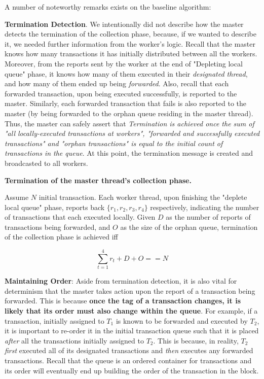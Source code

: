 A number of noteworthy remarks exists on the baseline algorithm:

\textbf{Termination Detection}. We intentionally did not describe how the master detects the
termination of the collection phase, because, if we wanted to describe it, we needed further information from the
worker's logic. Recall that the master knows how many transactions it has initially
distributed between all the workers. Moreover, from the reports sent by the worker at the end of
"Depleting local queue" phase, it knows how many of them executed in their \textit{designated
thread}, and how many of them ended up being \textit{forwarded}. Also, recall that each forwarded
transaction, upon being executed successfully, is reported to the master. Similarly, each forwarded
transaction that fails is also reported to the master (by being forwarded to the orphan queue
residing in the master thread). Thus, the master can safely assert that \textit{Termination is achieved once
the sum of "all locally-executed transactions at workers", "forwarded and successfully executed
transactions" and "orphan transactions" is equal to the initial count of transactions in the queue}.
At this point, the termination message is created and broadcasted to all workers.

\begin{definition}
	\textbf{Termination of the master thread's collection phase. }

	Assume $N$ initial transaction. Each worker thread, upon finishing the "deplete local queue"
	phase, reports back $\{ r_{1}, r_{2}, r_{3}, r_{4} \}$ respectively, indicating the number of transactions
	that each executed locally. Given $D$ as the number of reports of transactions being
	forwarded, and $O$ as the size of the orphan queue, termination of the collection phase is achieved iff

	\begin{equation}
		\sum_{t = 1}^{4} r_{t} + D + O == N
	\end{equation}
\end{definition}


\textbf{Maintaining Order}: Aside from termination detection, it is also vital for determinism that
the master takes action upon the report of a transaction being forwarded. This is because
\textbf{once the tag of a transaction changes, it is likely that its order must also change within
the queue}. For example, if a transaction, initially assigned to $T_{1}$ is known to be forwarded
and executed by $T_{2}$, it is important to re-order it in the initial transaction queue such that
it is placed \textit{after} all the transactions initially assigned to $T_{2}$. This is because, in
reality, $T_{2}$ \textit{first} executed all of its designated transactions and \textit{then}
executes any forwarded transactions. Recall that the queue is an ordered container for transactions
and its order will eventually end up building the order of the transaction in the block.

